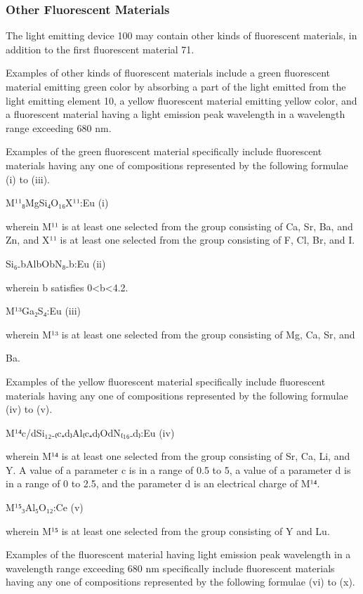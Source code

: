 \documentclass[11pt,a4paper]{article}
\begin{document}
\subsubsection{Other Fluorescent Materials}

The light emitting device 100 may contain other kinds of fluorescent materials, in addition to the first fluorescent material 71.

Examples of other kinds of fluorescent materials include a green fluorescent material emitting green color by absorbing a part of the light emitted from the light emitting element 10, a yellow fluorescent material emitting yellow color, and a fluorescent material having a light emission peak wavelength in a wavelength range exceeding 680 nm.

Examples of the green fluorescent material specifically include fluorescent materials having any one of compositions represented by the following formulae (i) to (iii).

M¹¹₈MgSi₄O₁₆X¹¹:Eu (i)

wherein M¹¹ is at least one selected from the group consisting of Ca, Sr, Ba, and Zn, and X¹¹ is at least one selected from the group consisting of F, Cl, Br, and I.

Si₆₋bAlbObN₈₋b:Eu (ii)

wherein b satisfies 0<b<4.2.

M¹³Ga₂S₄:Eu (iii)

wherein M¹³ is at least one selected from the group consisting of Mg, Ca, Sr, and

Ba.

Examples of the yellow fluorescent material specifically include fluorescent materials having any one of compositions represented by the following formulae (iv) to (v).

M¹⁴c/dSi₁₂₋₍c₊d₎Al₍c₊d₎OdN₍₁₆₋d₎:Eu (iv)

wherein M¹⁴ is at least one selected from the group consisting of Sr, Ca, Li, and Y. A value of a parameter c is in a range of 0.5 to 5, a value of a parameter d is in a range of 0 to 2.5, and the parameter d is an electrical charge of M¹⁴.

M¹⁵₃Al₅O₁₂:Ce (v)

wherein M¹⁵ is at least one selected from the group consisting of Y and Lu.

Examples of the fluorescent material having light emission peak wavelength in a wavelength range exceeding 680 nm specifically include fluorescent materials having any one of compositions represented by the following formulae (vi) to (x).
\end{document}
